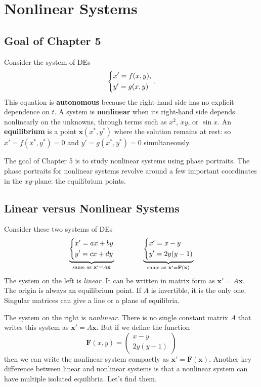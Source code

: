 \documentclass[10pt,letterpaper]{article}
\begin{document}
\section{Nonlinear Systems}

\subsection{Goal of Chapter 5}
Consider the system of DEs
\[
\begin{dcases}
x'=f(x,y),\\
y'=g(x,y)
\end{dcases}.
\]
This equation is \textbf{autonomous} because the right-hand side has no explicit dependence on $t$. A system is \textbf{nonlinear} when its right-hand side depends nonlinearly on the unknowns, through terms such as $x^2$, $xy$, or $\sin x$. An \textbf{equilibrium} is a point $\mathbf{x}(x^*,y^*)$ where the solution remains at rest: so $x'=f(x^*,y^*)=0$ and $y'=g(x^*,y^*)=0$ simultaneously.

The goal of Chapter 5 is to study nonlinear systems using phase portraits. The phase portraits for nonlinear systems revolve around a few important coordinates in the $xy$-plane: the equilibrium points.


\subsection{Linear versus Nonlinear Systems}
Consider these two systems of DEs
$$
\underbrace{\begin{dcases}
    x' = ax+by\\
    y' = cx +dy
\end{dcases}}_{\text{same as }\textbf{x}'=A\textbf{x}} \qquad  \qquad
\underbrace{\begin{dcases}
x'=x-y\\
y'=2y(y-1)
\end{dcases}}_{\text{same as } \textbf{x}'=\textbf{F}(\textbf{x})}
$$
The system on the left is \textit{linear}. It can be written in matrix form as $\mathbf{x}'=A\mathbf{x}$. The origin is always an equilibrium point. If $A$ is invertible, it is the only one. Singular matrices can give a line or a plane of equilibria.

The system on the right is \textit{nonlinear}. There is no single constant matrix $A$ that writes this system as $\mathbf{x}'=A\mathbf{x}$. But if we define the function
$$
\textbf{F}(x,y) = \begin{pmatrix}
    x-y\\
    2y(y-1)
\end{pmatrix}
$$
then we can write the nonlinear system compactly as $\textbf{x}'=\textbf{F}(\textbf{x})$. Another key difference between linear and nonlinear systems is that a nonlinear system can have multiple isolated equilibria. Let's find them.
\end{document}
